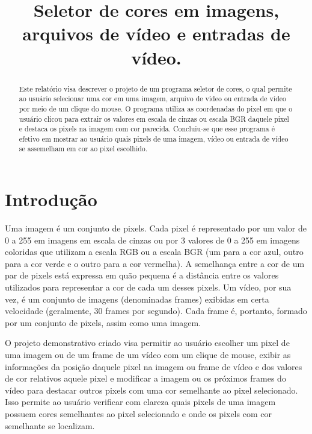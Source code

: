 \documentclass{bmvc2k}
\title{Seletor de cores em imagens, arquivos de vídeo e entradas de vídeo.}
\begin{document}
\maketitle

\begin{abstract}
  Este relatório visa descrever o projeto de um programa seletor de cores, o qual permite ao usuário selecionar uma cor em uma imagem, arquivo de vídeo ou entrada de vídeo por meio de um clique do mouse. O programa utiliza as coordenadas do pixel em que o usuário clicou para extrair os valores em escala de cinzas ou escala BGR daquele pixel e destaca os pixels na imagem com cor parecida. Concluiu-se que esse programa é efetivo em mostrar ao usuário quais pixels de uma imagem, vídeo ou entrada de vídeo se assemelham em cor ao pixel escolhido.
\end{abstract}

\section{Introdução}

Uma imagem é um conjunto de pixels. Cada pixel é representado por um valor de 0 a 255 em imagens em escala de cinzas ou por 3 valores de 0 a 255 em imagens coloridas que utilizam a escala RGB ou a escala BGR (um para a cor azul, outro para a cor verde e o outro para a cor vermelha). A semelhança entre a cor de um par de pixels está expressa em quão pequena é a distância entre os valores utilizados para representar a cor de cada um desses pixels. Um vídeo, por sua vez, é um conjunto de imagens (denominadas frames) exibidas em certa velocidade (geralmente, 30 frames por segundo). Cada frame é, portanto, formado por um conjunto de pixels, assim como uma imagem.

O projeto demonstrativo criado visa permitir ao usuário escolher um pixel de uma imagem ou de um frame de um vídeo com um clique de mouse, exibir as informações da posição daquele pixel na imagem ou frame de vídeo e dos valores de cor relativos aquele pixel e modificar a imagem ou os próximos frames do vídeo para destacar outros pixels com uma cor semelhante ao pixel selecionado. Isso permite ao usuário verificar com clareza quais pixels de uma imagem possuem cores semelhantes ao pixel selecionado e onde os pixels com cor semelhante se localizam.
\end{document}
